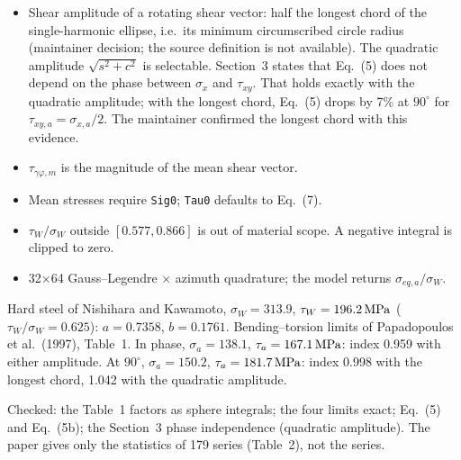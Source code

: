 \begin{itemize}
\item Shear amplitude of a rotating shear vector: half the longest chord of the single-harmonic
  ellipse, i.e.\ its minimum circumscribed circle radius (maintainer decision; the source
  definition is not available). The quadratic amplitude $\sqrt{s^2+c^2}$ is selectable. Section~3
  states that Eq.~(5) does not depend on the phase between $\sigma_x$ and $\tau_{xy}$. That holds
  exactly with the quadratic amplitude; with the longest chord, Eq.~(5) drops by 7\% at
  $90^\circ$ for $\tau_{xy,a}=\sigma_{x,a}/2$. The maintainer confirmed the longest chord with
  this evidence.
\item $\tau_{\gamma\varphi,m}$ is the magnitude of the mean shear vector.
\item Mean stresses require \texttt{Sig0}; \texttt{Tau0} defaults to Eq.~(7).
\item $\tau_W/\sigma_W$ outside $[0.577,0.866]$ is out of material scope. A negative integral is
  clipped to zero.
\item 32$\times$64 Gauss--Legendre $\times$ azimuth quadrature; the model returns
  $\sigma_{eq,a}/\sigma_W$.
\end{itemize}

 Hard steel of Nishihara and Kawamoto, $\sigma_W=313.9$,
$\tau_W=196.2\,\mathrm{MPa}$ ($\tau_W/\sigma_W=0.625$): $a=0.7358$, $b=0.1761$. Bending--torsion limits of
Papadopoulos et al.\ (1997), Table~1. In phase, $\sigma_a=138.1$, $\tau_a=167.1\,\mathrm{MPa}$: index 0.959
with either amplitude. At $90^\circ$, $\sigma_a=150.2$, $\tau_a=181.7\,\mathrm{MPa}$: index 0.998 with the
longest chord, 1.042 with the quadratic amplitude.

 Checked: the Table~1 factors as sphere integrals; the four limits exact; Eq.~(5)
and Eq.~(5b); the Section~3 phase independence (quadratic amplitude). The paper gives only the
statistics of 179 series (Table~2), not the series.
